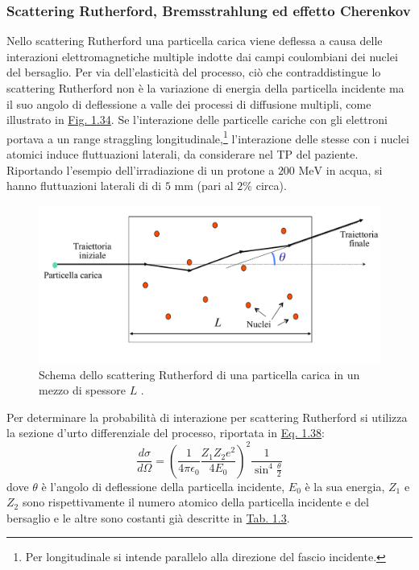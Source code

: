 \documentclass[12pt,a4paper,twoside]{report}
\begin{document}
	\subsubsection{Scattering Rutherford, Bremsstrahlung ed effetto Cherenkov}\label{par:scattering_Rutherford}
	Nello scattering Rutherford una particella carica viene deflessa a causa delle interazioni elettromagnetiche multiple indotte dai campi coulombiani dei nuclei del bersaglio. Per via dell'elasticità del processo, ciò che contraddistingue lo scattering Rutherford non è la variazione di energia della particella incidente ma il suo angolo di deflessione a valle dei processi di diffusione multipli, come illustrato in \hyperref[fig:rutherford_scattering]{Fig. 1.34}. Se l'interazione delle particelle cariche con gli elettroni portava a un range straggling longitudinale,\footnote{Per longitudinale si intende parallelo alla direzione del fascio incidente.} l'interazione delle stesse con i nuclei atomici induce fluttuazioni laterali, da considerare nel TP del paziente. Riportando l'esempio dell'irradiazione di un protone a $200\mbox{ MeV}$ in acqua, si hanno fluttuazioni laterali di di $5\mbox{ mm}$ (pari al $2\%$ circa).
	\begin{figure}[H]
		\centering
		\includegraphics[width=0.9\linewidth]{rutherford_scattering.pdf}
		\caption{Schema dello scattering Rutherford di una particella carica in un mezzo di spessore $L$ \cite{batignaniNotes}.}
		\label{fig:rutherford_scattering}
	\end{figure}
	Per determinare la probabilità di interazione per scattering Rutherford si utilizza la sezione d'urto differenziale del processo, riportata in \hyperref[eq:rutherford_scattering]{Eq. 1.38}:
	\begin{equation}
		\frac{d\sigma}{d\Omega}=\left(\frac{1}{4\pi\epsilon_0}\frac{Z_1Z_2e^2}{4E_0}\right)^2\frac{1}{\sin^4{\frac{\theta}{2}}}
		\label{eq:rutherford_scattering}
	\end{equation}
	dove $\theta$ è l'angolo di deflessione della particella incidente, $E_0$ è la sua energia, $Z_1$ e $Z_2$ sono rispettivamente il numero atomico della particella incidente e del bersaglio e le altre sono costanti già descritte in \hyperref[tab:bethe_bloch]{Tab. 1.3}.
	
\end{document}
